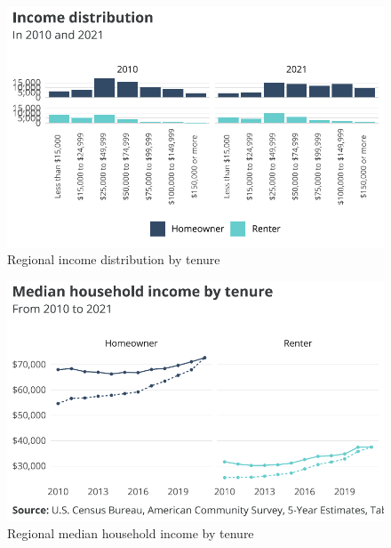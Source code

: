 \documentclass[
  letterpaper,
  DIV=11,
  numbers=noendperiod]{scrreprt}
\begin{document}
\begin{figure}[H]

{\centering \includegraphics{./part-3-1_files/figure-pdf/fig-incdist-1.pdf}

}

\caption{\label{fig-incdist}Regional income distribution by tenure}

\end{figure}

\begin{figure}[H]

{\centering \includegraphics{./part-3-1_files/figure-pdf/fig-medinc-1.pdf}

}

\caption{\label{fig-medinc}Regional median household income by tenure}

\end{figure}
\end{document}
